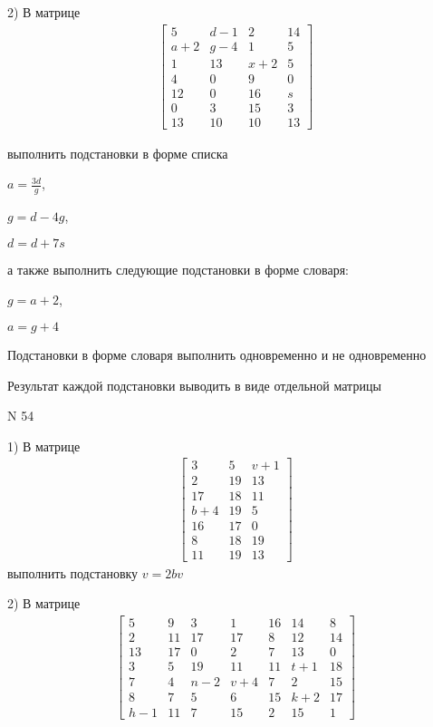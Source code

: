 \documentclass[11pt]{report}
\begin{document}
    2) В матрице
\begin{align*}
\left[\begin{matrix}5 & d - 1 & 2 & 14\\a + 2 & g - 4 & 1 & 5\\1 & 13 & x + 2 & 5\\4 & 0 & 9 & 0\\12 & 0 & 16 & s\\0 & 3 & 15 & 3\\13 & 10 & 10 & 13\end{matrix}\right]
\end{align*}

выполнить подстановки в форме списка

$a=\frac{3 d}{g}$,

$g=d - 4 g$,

$d=d + 7 s$

а также выполнить следующие подстановки в форме словаря:

$g=a + 2$,

$a=g + 4$


    Подстановки в форме словаря выполнить одновременно и не одновременно


    Результат каждой подстановки выводить в виде отдельной матрицы

\newpage
N 54


    1) В матрице
\begin{align*}
\left[\begin{matrix}3 & 5 & v + 1\\2 & 19 & 13\\17 & 18 & 11\\b + 4 & 19 & 5\\16 & 17 & 0\\8 & 18 & 19\\11 & 19 & 13\end{matrix}\right]
\end{align*}
выполнить подстановку $v=2 b v$


    2) В матрице
\begin{align*}
\left[\begin{matrix}5 & 9 & 3 & 1 & 16 & 14 & 8\\2 & 11 & 17 & 17 & 8 & 12 & 14\\13 & 17 & 0 & 2 & 7 & 13 & 0\\3 & 5 & 19 & 11 & 11 & t + 1 & 18\\7 & 4 & n - 2 & v + 4 & 7 & 2 & 15\\8 & 7 & 5 & 6 & 15 & k + 2 & 17\\h - 1 & 11 & 7 & 15 & 2 & 15 & 1\end{matrix}\right]
\end{align*}
\end{document}
